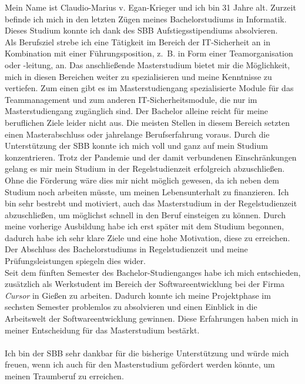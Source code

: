 \documentclass[fontsize=12pt,parskip=half-]{scrartcl}
\begin{document}
\begin{Motivation}

    Mein Name ist Claudio-Marius v. Egan-Krieger und ich bin 31 Jahre alt. Zurzeit befinde ich mich in den letzten Zügen meines Bachelorstudiums in Informatik.
    Dieses Studium konnte ich dank des SBB Aufstiegsstipendiums absolvieren.\\
    Als Berufsziel strebe ich eine Tätigkeit im Bereich der IT-Sicherheit an in Kombination mit einer Führungsposition, z.~B. in Form einer Teamorganisation oder -leitung, an.
    Das anschließende Masterstudium bietet mir die Möglichkeit, mich in diesen Bereichen weiter zu spezialisieren und meine Kenntnisse zu vertiefen.
    Zum einen gibt es im Masterstudiengang spezialisierte Module für das Teammanagement und zum anderen IT-Sicherheitsmodule, die nur im Masterstudiengang zugänglich sind.
    Der Bachelor alleine reicht für meine beruflichen Ziele leider nicht aus. Die meisten Stellen in diesem Bereich setzten einen Masterabschluss oder jahrelange Berufserfahrung voraus.
    Durch die Unterstützung der SBB konnte ich mich voll und ganz auf mein Studium konzentrieren. Trotz der Pandemie und der damit verbundenen Einschränkungen gelang es mir mein Studium in der Regelstudienzeit erfolgreich abzuschließen.
    Ohne die Förderung wäre dies mir nicht möglich gewesen, da ich neben dem Studium noch arbeiten müsste, um meinen Lebensunterhalt zu finanzieren.
    Ich bin sehr bestrebt und motiviert, auch das Masterstudium in der Regelstudienzeit abzuschließen, um möglichst schnell in den Beruf einsteigen zu können. Durch meine vorherige Ausbildung habe ich erst später mit dem Studium begonnen, dadurch habe ich sehr klare Ziele und eine hohe Motivation, diese zu erreichen.
    Der Abschluss des Bachelorstudiums in Regelstudienzeit und meine Prüfungsleistungen spiegeln dies wider.\\
    Seit dem fünften Semester des Bachelor-Studienganges habe ich mich entschieden, zusätzlich als Werkstudent im Bereich der Softwareentwicklung bei der Firma \textit{Cursor} in Gießen zu arbeiten. Dadurch konnte ich meine Projektphase im sechsten Semester problemlos zu absolvieren und einen Einblick in die Arbeitswelt der Softwareentwicklung gewinnen. Diese Erfahrungen haben mich in meiner Entscheidung für das Masterstudium bestärkt. \\
    \\
    Ich bin der SBB sehr dankbar für die bisherige Unterstützung und würde mich freuen, wenn ich auch für den Masterstudium gefördert werden könnte, um meinen Traumberuf zu erreichen.

\end{Motivation}
\end{document}
